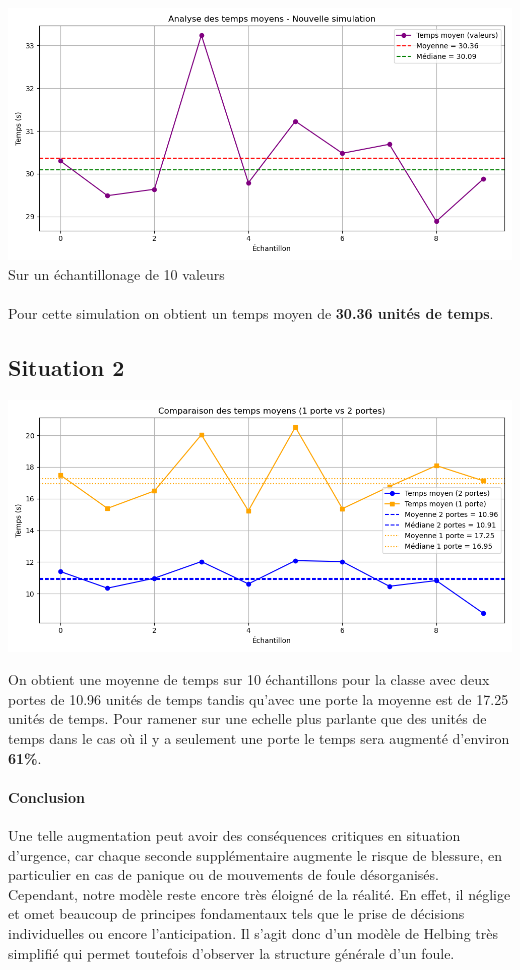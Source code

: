 \documentclass[a4paper,12pt]{article}
\begin{document}
\includegraphics[width=\textwidth]{resultat.png} %
Sur un échantillonage de 10 valeurs
\\
\\
Pour cette simulation on obtient un temps moyen de \textbf{30.36 unités de temps}.
\subsection{Situation 2}


\includegraphics[width=\textwidth]{resultat_2.png} %

On obtient une moyenne de temps sur 10 échantillons pour la classe avec deux portes de 10.96 unités de temps tandis qu'avec une porte la moyenne est de 17.25 unités de temps. Pour ramener sur une echelle plus parlante que des unités de temps dans le cas où il y a seulement une porte le temps sera augmenté d'environ \textbf{61\%}. 
\paragraph{Conclusion} Une telle augmentation peut avoir des conséquences critiques en situation d'urgence, car chaque seconde supplémentaire augmente le risque de blessure, en particulier en cas de panique ou de mouvements de foule désorganisés. \\ \indent Cependant, notre modèle reste encore très éloigné de la réalité. En effet, il néglige et omet beaucoup de principes fondamentaux tels que le prise de décisions individuelles ou encore l'anticipation. Il s'agit donc d'un modèle de Helbing très simplifié qui permet toutefois d'observer la structure générale d'un foule.
\end{document}
